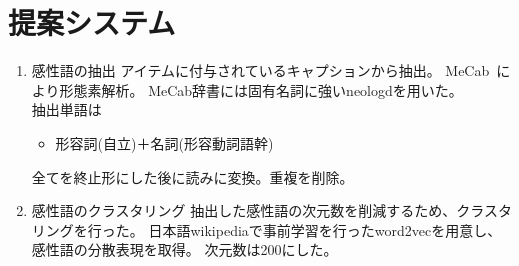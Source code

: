 \chapter{提案システム}
\begin{enumerate}
  \item 感性語の抽出
  アイテムに付与されているキャプションから抽出。
  MeCab~\cite{mecab}により形態素解析。
  MeCab辞書には固有名詞に強いneologdを用いた。
  \\
  抽出単語は
  \begin{itemize}
    \item 形容詞(自立)＋名詞(形容動詞語幹)
  \end{itemize}
  全てを終止形にした後に読みに変換。重複を削除。

  \item 感性語のクラスタリング
  抽出した感性語の次元数を削減するため、クラスタリングを行った。
  日本語wikipediaで事前学習を行ったword2vecを用意し、感性語の分散表現を取得。
  次元数は200にした。

\end{enumerate}
　
